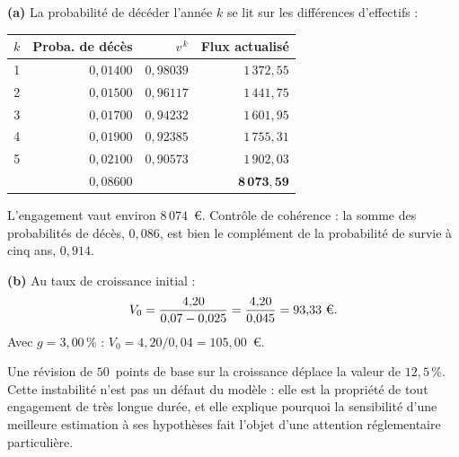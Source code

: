 \begin{corrige}
\textbf{(a)} La probabilité de décéder l'année $k$ se lit sur les différences
d'effectifs :
\begin{center}\small
\begin{tabular}{crrr}
\toprule
$k$ & Proba. de décès & $v^{\,k}$ & Flux actualisé \\
\midrule
1 & $0{,}01400$ & $0{,}98039$ & $1\,372{,}55$ \\
2 & $0{,}01500$ & $0{,}96117$ & $1\,441{,}75$ \\
3 & $0{,}01700$ & $0{,}94232$ & $1\,601{,}95$ \\
4 & $0{,}01900$ & $0{,}92385$ & $1\,755{,}31$ \\
5 & $0{,}02100$ & $0{,}90573$ & $1\,902{,}03$ \\
\midrule
  & $0{,}08600$ & & $\mathbf{8\,073{,}59}$ \\
\bottomrule
\end{tabular}
\end{center}
L'engagement vaut environ $8\,074$~\euro. Contrôle de cohérence : la somme des
probabilités de décès, $0{,}086$, est bien le complément de la probabilité de
survie à cinq ans, $0{,}914$.

\medskip
\textbf{(b)} Au taux de croissance initial :
\[
  V_0 = \frac{4{,}20}{0{,}07-0{,}025} = \frac{4{,}20}{0{,}045} = 93{,}33\ \text{\euro}.
\]
Avec $g = 3{,}00\,\%$ : $V_0 = 4{,}20/0{,}04 = 105{,}00$~\euro.

\medskip
Une révision de $50$~points de base sur la croissance déplace la valeur de
$12{,}5\,\%$. Cette instabilité n'est pas un défaut du modèle : elle est la
propriété de tout engagement de très longue durée, et elle explique pourquoi la
sensibilité d'une meilleure estimation à ses hypothèses fait l'objet d'une
attention réglementaire particulière.
\end{corrige}

